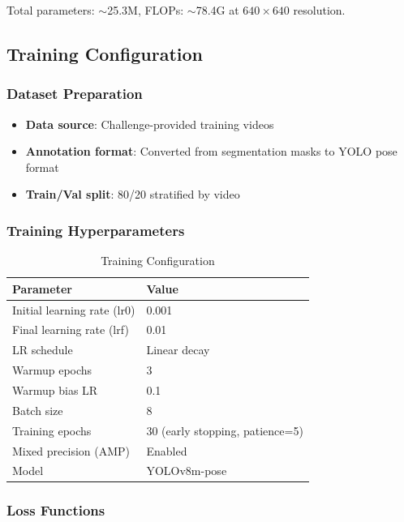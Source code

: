 \documentclass[11pt]{article}
\begin{document}
Total parameters: $\sim$25.3M, FLOPs: $\sim$78.4G at $640 \times 640$ resolution.

\subsection{Training Configuration}

\subsubsection{Dataset Preparation}

\begin{itemize}[noitemsep]
    \item \textbf{Data source}: Challenge-provided training videos
    \item \textbf{Annotation format}: Converted from segmentation masks to YOLO pose format
    \item \textbf{Train/Val split}: 80/20 stratified by video
\end{itemize}

\subsubsection{Training Hyperparameters}

\begin{table}[h]
\centering
\caption{Training Configuration}
\begin{tabular}{ll}
\toprule
\textbf{Parameter} & \textbf{Value} \\
\midrule
Initial learning rate (lr0) & 0.001 \\
Final learning rate (lrf) & 0.01 \\
LR schedule & Linear decay \\
Warmup epochs & 3 \\
Warmup bias LR & 0.1 \\
Batch size & 8 \\
Training epochs & 30 (early stopping, patience=5) \\
Mixed precision (AMP) & Enabled \\
Model & YOLOv8m-pose \\
\bottomrule
\end{tabular}
\end{table}

\subsubsection{Loss Functions}
\end{document}
